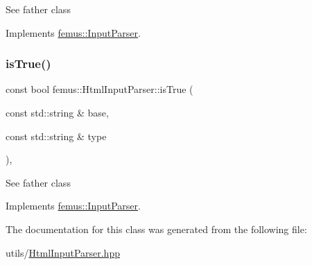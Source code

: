 See father class 

Implements \mbox{\hyperlink{classfemus_1_1_input_parser_a30b8407afe22e7ff56b67766cef51929}{femus\+::\+Input\+Parser}}.

\mbox{\label{classfemus_1_1_html_input_parser_a53172b90136c6131ad3c97a92f3cf29a}} 
\subsubsection{\texorpdfstring{is\+True()}{isTrue()}}
{\footnotesize\ttfamily const bool femus\+::\+Html\+Input\+Parser\+::is\+True (\begin{DoxyParamCaption}\item[{const std\+::string \&}]{base,  }\item[{const std\+::string \&}]{type }\end{DoxyParamCaption})\hspace{0.3cm}{\ttfamily [inline]}, {\ttfamily [virtual]}}

See father class 

Implements \mbox{\hyperlink{classfemus_1_1_input_parser_aa9a108efd3c78de43435a43c229a21e5}{femus\+::\+Input\+Parser}}.



The documentation for this class was generated from the following file\+:\begin{DoxyCompactItemize}
\item 
utils/\mbox{\hyperlink{_html_input_parser_8hpp}{Html\+Input\+Parser.\+hpp}}\end{DoxyCompactItemize}

